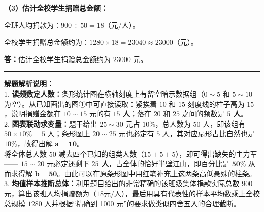 \documentclass[12pt, a4paper]{ctexrep}
\begin{document}
\begin{center}
\end{center}

\vspace{0.6cm}

\textbf{（3）估计全校学生捐赠总金额：}

\vspace{0.4cm}
全班人均捐款为：$900 \div 50 = 18$（元/人）。

全校学生捐赠总金额约为：$1280 \times 18 = 23040 \approx 23000$（元）。

\vspace{0.4cm}
\textbf{答：}估计全校学生捐赠总金额约为 $23000$ 元。

\vspace{0.8cm}
\hrule
\vspace{0.4cm}

{\small\color{gray}
\textbf{解题解析说明：}\\
1. \textbf{读频数定人数：}条形统计图在横轴刻度上有留空暗示数据组（$0\sim 5$ 和 $5\sim 10$ 为空）。从已知画出的图①中可直接读取：紧挨着 $10$ 和 $15$ 刻度线的柱子高为 $15$，说明捐赠金额在 $10\sim 15$ 元的有 \textbf{$15$ 人}；落在 $20$ 和 $25$ 之间的频数是 \textbf{$5$ 人}。\\
2. \textbf{图表联动求变量：}题干给出 $25\sim 30$ 元占 $10\%$，总人数为 $50$ 人，即该组有 $50 \times 10\% = 5$ 人；条形图上 $20\sim 25$ 元也必定有 $5$ 人，其对应扇形占比自然也是 $10\%$，故得出解 $\boldsymbol{a=10}$。\\
将全体总人数 $50$ 减去四个已知的组类人数（$15+5+5$），即可得出缺失的主力军—— $15\sim 20$ 元必定还剩下 \textbf{$25$ 人}，占全体的恰好半壁江山，即百分比是 $\boldsymbol{50\%}$ 从而求得解 $\boldsymbol{b=50}$。由此可以在原条形图中用红笔补充上这两条高低悬殊的柱条。\\
3. \textbf{均值样本推断总体：}利用题目给出的非常精确的该班级集体捐款实际总数 $900$ 元，算出该班人均捐赠额为（$18$元/人），最后用具有代表性的样本平均数乘上全校总规模 $1280$ 人并根据“精确到 1000 元”的要求做类似四舍五入的合理截断。
}
\end{document}
